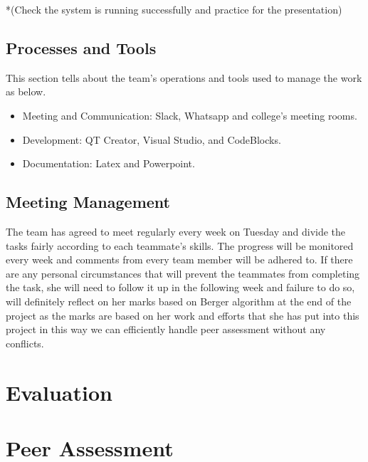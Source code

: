 \documentclass{article}
\begin{document}
*(Check the system is running successfully and practice for the presentation) 
 


\subsection{Processes and Tools}

This section tells about the team's operations and tools used to manage the work as below.   
\begin{itemize}

\item Meeting and Communication: Slack, Whatsapp and college's meeting rooms.
\item Development: QT Creator, Visual Studio, and CodeBlocks.
\item Documentation: Latex and Powerpoint.

\end{itemize}



\subsection{Meeting Management} 
The team has agreed to meet regularly every week on Tuesday and divide the tasks fairly according to each teammate's skills. The progress will be monitored every week and comments from every team member will be adhered to. \newline If there are any personal circumstances that will prevent the teammates from completing the task, she will need to follow it up in the following week and failure to do so, will definitely reflect on her marks based on Berger algorithm at the end of the project as the marks are based on her work and efforts that she has put into this project in this way we can efficiently handle peer assessment without any conflicts. 

\section{Evaluation}
\section{Peer Assessment}
\end{document}
